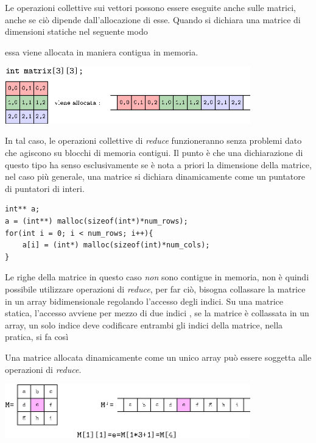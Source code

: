 \documentclass[10pt, letterpaper]{report}
\begin{document}
Le operazioni collettive sui vettori possono essere eseguite anche sulle matrici, anche se ciò dipende 
dall'allocazione di esse. Quando si dichiara una matrice di dimensioni 
statiche nel seguente modo \begin{quotation}
\end{quotation}
essa viene allocata in maniera contigua in memoria.
\begin{center}
    \includegraphics[width=0.8\textwidth]{images/matrixDeclaration.eps}
\end{center}
In tal caso, le operazioni collettive di \textit{reduce} funzioneranno senza problemi dato che 
agiscono su blocchi di memoria contigui. Il punto è che una dichiarazione di questo tipo ha senso 
esclusivamente se è nota a priori la dimensione della matrice, nel caso più generale, una matrice 
si dichiara dinamicamente come un puntatore di puntatori di interi.
\begin{lstlisting}[style=CStyle]
int** a;
a = (int**) malloc(sizeof(int*)*num_rows);
for(int i = 0; i < num_rows; i++){
    a[i] = (int*) malloc(sizeof(int)*num_cols);
}
\end{lstlisting}
Le righe della matrice in questo caso \textit{non} sono contigue in memoria, non è quindi possibile 
utilizzare operazioni di \textit{reduce}, per far ciò, bisogna collassare la matrice in un 
array bidimensionale regolando l'accesso degli indici. Su una matrice statica, l'accesso avviene 
per mezzo di due indici , se la matrice è collassata in un 
array, un solo indice deve codificare entrambi gli indici della matrice, nella pratica, si fa così\begin{quote}
\end{quote}
Una matrice allocata dinamicamente come un unico array può essere soggetta alle operazioni di \textit{reduce}.
\begin{center}
    \includegraphics[width=0.8\textwidth]{images/matrixDeclaration2.eps}
\end{center}
\end{document}
